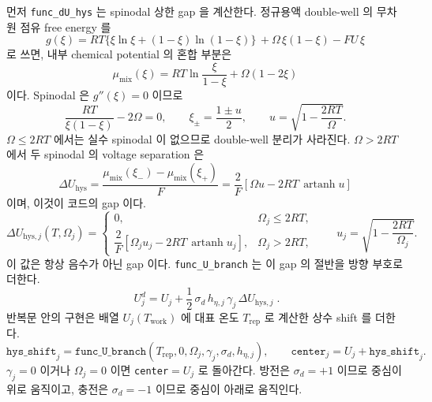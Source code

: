 \documentclass[11pt,a4paper]{article}
\newcommand{\hys}{\mathrm{hys}}
\newcommand{\work}{\mathrm{work}}
\newcommand{\rep}{\mathrm{rep}}
\begin{document}
먼저 \texttt{func\_dU\_hys} 는 spinodal 상한 gap 을 계산한다. 정규용액 double-well 의 무차원 점유 free energy 를
\begin{equation}
g(\xi)=RT\{\xi\ln\xi+(1-\xi)\ln(1-\xi)\}
\,+\Omega\,\xi(1-\xi)-F U\,\xi
\label{eq:doublewell}
\end{equation}
로 쓰면, 내부 chemical potential 의 혼합 부분은
\begin{equation}
\mu_{\mathrm{mix}}(\xi)=RT\ln\frac{\xi}{1-\xi}+\Omega(1-2\xi)
\label{eq:mumix}
\end{equation}
이다. Spinodal 은 $g''(\xi)=0$ 이므로
\begin{equation}
\frac{RT}{\xi(1-\xi)}-2\Omega=0,\qquad
\xi_\pm=\frac{1\pm u}{2},\qquad
u=\sqrt{1-\frac{2RT}{\Omega}}.
\label{eq:spinodalsolve}
\end{equation}
$\Omega\le2RT$ 에서는 실수 spinodal 이 없으므로 double-well 분리가 사라진다. $\Omega>2RT$ 에서 두 spinodal 의 voltage separation 은
\begin{equation}
\Delta U_{\hys}
=\frac{\mu_{\mathrm{mix}}(\xi_-)-\mu_{\mathrm{mix}}(\xi_+)}{F}
=\frac{2}{F}\left[\Omega u-2RT\,\operatorname{artanh}u\right]
\label{eq:dUhysderive}
\end{equation}
이며, 이것이 코드의 gap 이다.
\begin{equation}
\Delta U_{\hys,j}(T,\Omega_j)=
\begin{cases}
0,&\Omega_j\le2RT,\\[3pt]
\dfrac{2}{F}\left[\Omega_j u_j-2RT\,\operatorname{artanh}u_j\right],
&\Omega_j>2RT,
\end{cases}
\qquad
u_j=\sqrt{1-\frac{2RT}{\Omega_j}}.
\label{eq:dUhys}
\end{equation}
이 값은 항상 음수가 아닌 gap 이다. \texttt{func\_U\_branch} 는 이 gap 의 절반을 방향 부호로 더한다.
\begin{equation}
\boxed{\;U_j^{d}=U_j+\frac12\,\sigma_d\,h_{\eta,j}\,\gamma_j\,\Delta U_{\hys,j}\;.}
\label{eq:Ubranch}
\end{equation}
반복문 안의 구현은 배열 $U_j(T_{\work})$ 에 대표 온도 $T_{\rep}$ 로 계산한 상수 shift 를 더한다.
\begin{equation}
\texttt{hys\_shift}_j=
\texttt{func\_U\_branch}(T_{\rep},0,\Omega_j,\gamma_j,\sigma_d,h_{\eta,j}),
\qquad
\texttt{center}_j=U_j+\texttt{hys\_shift}_j.
\label{eq:center}
\end{equation}
$\gamma_j=0$ 이거나 $\Omega_j=0$ 이면 \texttt{center}$=U_j$ 로 돌아간다. 방전은 $\sigma_d=+1$ 이므로 중심이 위로 움직이고, 충전은 $\sigma_d=-1$ 이므로 중심이 아래로 움직인다.
\end{document}

